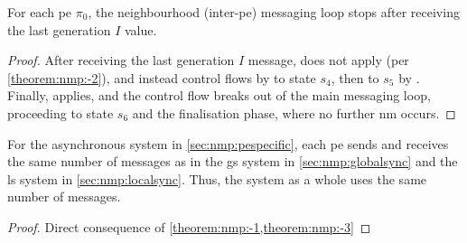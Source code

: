 \begin{theorem}\label{theorem:nmp:-3}
    For each \gls{pe} $\pi_0$, the neighbourhood (inter-\gls{pe}) messaging loop stops after receiving the last generation $I$ value.
\end{theorem}

\begin{proof}
    After receiving the last generation \(I\) message,  does not apply (per \cref{theorem:nmp:-2}), and instead control flows by  to state \(s_4\), then to \(s_5\) by .  Finally,  applies, and the control flow breaks out of the main messaging loop, proceeding to state \(s_6\) and the finalisation phase, where no further \gls{nm} occurs. 
\end{proof}

\begin{theorem}\label{theorem:nmp:-4}
    For the asynchronous system in \cref{sec:nmp:pespecific}, 
    each \gls{pe} sends and receives the same number of messages as in the \gls{gs} system in \cref{sec:nmp:globalsync} and the \gls{ls} system in \cref{sec:nmp:localsync}.   
    Thus, the system as a whole uses the same number of messages.
\end{theorem}

\begin{proof}
    Direct consequence of \cref{theorem:nmp:-1,theorem:nmp:-3}
\end{proof}

